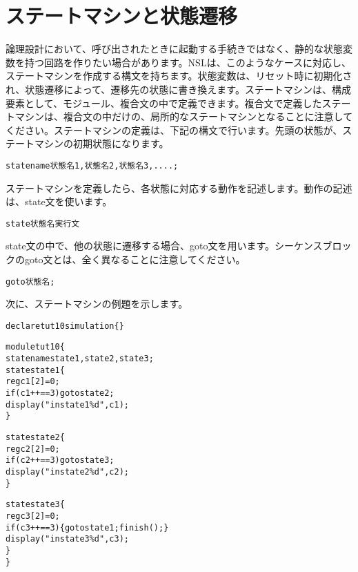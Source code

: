 \chapter{ステートマシンと状態遷移}
\label{chap:state}

論理設計において、呼び出されたときに起動する手続きではなく、静的な状態変数を持つ回路を作りたい場合があります。NSLは、このようなケースに対応し、ステートマシンを作成する構文を持ちます。状態変数は、リセット時に初期化され、状態遷移によって、遷移先の状態に書き換えます。ステートマシンは、構成要素として、モジュール、複合文の中で定義できます。複合文で定義したステートマシンは、複合文の中だけの、局所的なステートマシンとなることに注意してください。ステートマシンの定義は、下記の構文で行います。先頭の状態が、ステートマシンの初期状態になります。

\begin{reviewemlist}
\begin{alltt}
state\textunderscore{}name 状態名1, 状態名2, 状態名3, .... ;
\end{alltt}
\end{reviewemlist}

ステートマシンを定義したら、各状態に対応する動作を記述します。動作の記述は、state文を使います。

\begin{reviewemlist}
\begin{alltt}
state 状態名 実行文
\end{alltt}
\end{reviewemlist}

state文の中で、他の状態に遷移する場合、goto文を用います。シーケンスブロックのgoto文とは、全く異なることに注意してください。

\begin{reviewemlist}
\begin{alltt}
goto 状態名 ;
\end{alltt}
\end{reviewemlist}

次に、ステートマシンの例題を示します。

\begin{reviewlist}
\begin{alltt}
declare tut10 simulation \{\}

module tut10 \{
   state\textunderscore{}name state1, state2, state3;
   state state1 \{
       reg c1[2]=0;
       if(c1++ == 3) goto state2;
       \textunderscore{}display("in state1 \%d",c1);
   \}

   state state2 \{
       reg c2[2]=0;
       if(c2++ == 3) goto state3;
       \textunderscore{}display("in state2 \%d",c2);
   \}

   state state3 \{
       reg c3[2]=0;
       if(c3++ == 3) \{goto state1; \textunderscore{}finish();\}
       \textunderscore{}display("in state3 \%d",c3);
   \}
 \}
\end{alltt}
\end{reviewlist}


